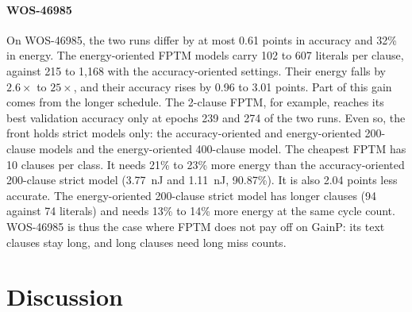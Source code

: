 \documentclass[preprint,review,12pt]{elsarticle}
\newcommand{\gainp}{GainP}
\newcommand{\hyp}[1]{#1}   %
\newcommand{\wosnew}[1]{#1}   %
\begin{document}
\paragraph{WOS-46985}\label{sec:wosretune}
\wosnew{On WOS-46985, the two runs differ by at most 0.61 points in accuracy and 32\% in energy.
The energy-oriented FPTM models carry 102 to 607 literals per clause, against 215 to 1,168 with the accuracy-oriented settings. Their energy falls by $2.6\times$ to $25\times$, and their accuracy rises by 0.96 to 3.01 points.
Part of this gain comes from the longer schedule. The 2-clause FPTM, for example, reaches its best validation accuracy only at epochs 239 and 274 of the two runs.}
\wosnew{Even so, the front holds strict models only: the accuracy-oriented and energy-oriented 200-clause models and the energy-oriented 400-clause model.
The cheapest FPTM has 10 clauses per class. It needs 21\% to 23\% more energy than the accuracy-oriented 200-clause strict model} (\hyp{3.77~nJ} and \hyp{1.11~nJ}, 90.87\%). \wosnew{It is also 2.04 points less accurate.
The energy-oriented 200-clause strict model has longer clauses (94 against 74 literals) and needs 13\% to 14\% more energy at the same cycle count.
WOS-46985 is thus the case where FPTM does not pay off on \gainp{}: its text clauses stay long, and long clauses need long miss counts.}
\section{Discussion}\label{sec:discussion}
\end{document}
